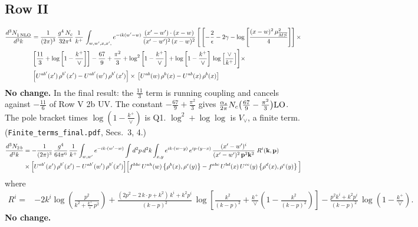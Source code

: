 \documentclass[9pt]{article}
\newcommand{\new}[1]{{\color{blue}#1}}
\numberwithin{equation}{section}
\begin{document}
\subsection{Row II}
\begin{align}
     \frac{d^{3}N_{1\,\rm NLO}^{\rm}}{d^{3}k} &  = \frac{1}{(2\pi)^{3}}\, \frac{g^{4}\,N_{c}}{32\pi^{4}}\,\frac{1}{k^{+}}\, \int_{w, w',x,x',} e^{-ik(w^\prime-w)}\, \frac{(x'-w')\cdot (x-w)}{(x'-w')^{2}\, (x-w)^{2}}\, \Bigg[\left[-\frac{2}{\epsilon}-2\gamma-\log{\left[\frac{(x-w)^{2}\,\mu^{2}_{\overline{MS}}}{4}\right]}\right]\times \notag \\ & \left[\frac{11}{3}+\log{\left[1-\frac{k^{+}}{\vee}\right]}\right]-\frac{67}{9}+\frac{\pi^{2}}{3}+\log^{2}{\left[1-\frac{k^{+}}{\vee}\right]}+\log{\left[1-\frac{k^{+}}{\vee}\right]}\,\log{\left[\frac{\vee}{k^{+}}\right]}\Bigg]\times\notag \\ & \left[U^{ab'}(x')\,\rho^{b'}(x') - U^{ab'}(w')\,\rho^{b'}(x')\right]\times\,\left[U^{ab}(w)\,\rho^{b}(x) - U^{ab}(x)\,\rho^{b}(x)\right]
\end{align}
\new{\textbf{No change.} In the final result: the $\frac{11}{3}$ term is running coupling and cancels against $-\frac{11}{6}$ of Row V 2b UV. The constant $-\frac{67}{9}+\frac{\pi^2}{3}$ gives $\frac{\alpha_s}{2\pi}N_c\big(\frac{67}{9}-\frac{\pi^2}{3}\big){\rm LO}$. The pole bracket times $\log(1-\frac{k^+}{\vee})$ is Q1. $\log^2+\log\log$ is $V_\vee$, a finite term. (\texttt{Finite\_terms\_final.pdf}, Secs.~3, 4.)}
\begin{align}
\frac{d^{3}N_{2\,b}}{d^{3}k} & = -\frac{1}{(2\pi)^{3}}\,\frac{g^{4}}{64\pi^{6}}\,\frac{1}{k^{+}}\int_{w,w'} e^{-ik\cdot(w'-w)}
\int d^{2}p\,d^{2}k\int_{x,y} e^{ik\cdot(w-y)}\,e^{ip\cdot(y-x)}\,\frac{(x'-w')^{i}}{(x'-w')^{2}\,\mathbf{p}^{2}\mathbf{k}^{2}}\;R^{i}(\mathbf{k},\mathbf{p})\notag\\
&\times\Big[U^{ab'}(x')\,\rho^{b'}(x')-U^{ab'}(w')\,\rho^{b'}(x')\Big]
\Big[f^{hbc}\,U^{ah}(w)\left\{\rho^{b}(x),\rho^{c}(y)\right\}-f^{abc}\,U^{bd}(x)\,U^{ce}(y)\left\{\rho^{d}(x),\rho^{e}(y)\right\}\Big]
\end{align}
where
\begin{align}
R^{i} =& -2k^{i}\log\left(\frac{p^{2}}{k^{2}+\frac{k^{+}}{\vee}\,p^{2}}\right)
+\frac{(2p^{2}-2\,k\cdot p+k^{2})\,k^{i}+k^{2}p^{i}}{(k-p)^{2}}\,
\log\left[\frac{k^{2}}{(k-p)^{2}}+\frac{k^{+}}{\vee}\left(1-\frac{k^{2}}{(k-p)^{2}}\right)\right]
-\frac{p^{2}k^{i}+k^{2}p^{i}}{(k-p)^{2}}\,\log\left(1-\frac{k^{+}}{\vee}\right).
\end{align}
\new{\textbf{No change.}}
\end{document}
